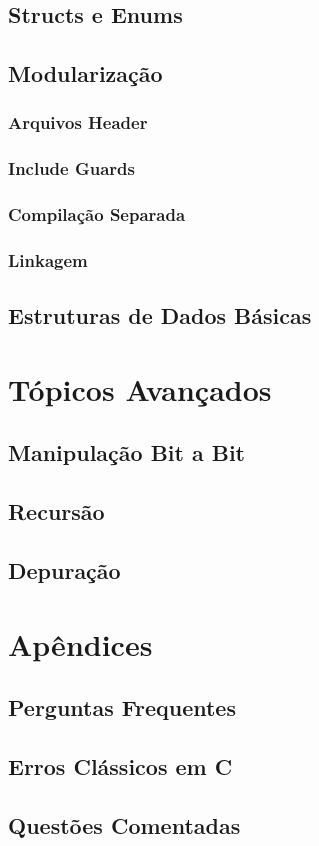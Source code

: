 \documentclass[12pt,a4paper,oneside]{extreport}
\begin{document}
\chapter{Structs e Enums}

\chapter{Modularização}

\section{Arquivos Header}

\section{Include Guards}

\section{Compilação Separada}

\section{Linkagem}

\chapter{Estruturas de Dados Básicas}




\part{Tópicos Avançados}

\chapter{Manipulação Bit a Bit}

\chapter{Recursão}

\chapter{Depuração}


\appendix

\part{Apêndices}

\chapter{Perguntas Frequentes}

\chapter{Erros Clássicos em C}

\chapter{Questões Comentadas}
\end{document}
